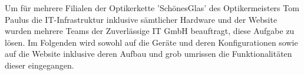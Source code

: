 Um für mehrere Filialen der Optikerkette 'SchönesGlas' des Optikermeisters Tom Paulus die IT-Infrastruktur inklusive sämtlicher Hardware und der Website wurden mehrere Teams der
Zuverlässige IT GmbH beauftragt, diese Aufgabe zu lösen. Im Folgenden wird sowohl auf die Geräte und deren Konfigurationen sowie auf die Website inklusive deren Aufbau und grob umrissen
die Funktionalitäten dieser eingegangen.